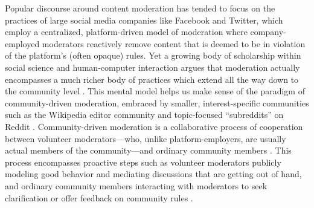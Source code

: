 \documentclass[11pt,letterpaper]{article}
\begin{document}
Popular discourse around content moderation has tended to focus on the practices of large social media companies like Facebook and Twitter, which employ a centralized, platform-driven model of moderation where company-employed moderators reactively remove content that is deemed to be in violation of the platform's (often opaque) rules.
Yet a growing body of scholarship within social science and human-computer interaction argues that moderation actually encompasses a much richer body of practices which extend all the way down to the community level \cite{brewer_inclusion_2020,lampe_slashdot_2004,seering_reconsidering_2020}.
This mental model helps us make sense of the paradigm of community-driven moderation, embraced by smaller, interest-specific communities such as the Wikipedia editor community and topic-focused ``subreddits'' on Reddit \cite{chandrasekharan_internets_2018,halfaker_rise_2013}.
Community-driven moderation is a collaborative process of cooperation between volunteer moderators---who, unlike platform-employers, are usually actual members of the community---and ordinary community members \cite{lo_when_2018}.
This process encompasses proactive steps such as volunteer moderators publicly modeling good behavior and mediating discussions that are getting out of hand, and ordinary community members interacting with moderators to seek clarification or offer feedback on community rules \cite{seering_shaping_2017,seering_reconsidering_2020,billings_understanding_2010}.


\end{document}
